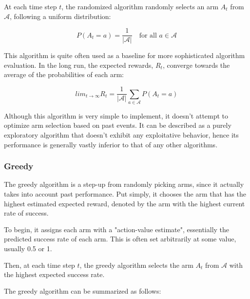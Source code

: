 At each time step $t$, the randomized algorithm randomly selects an arm $A_t$ from $\mathcal{A}$, following a uniform distribution:

$$P(A_t = a) = \frac{1}{{|\mathcal{A}|}} \quad \text{for all } a \in \mathcal{A}$$

This algorithm is quite often used as a baseline for more sophisticated algorithm evaluation. In the long run, the expected rewards, $R_t$, converge towards the average of the probabilities of each arm:

$$lim_{{t \to \infty}} R_t = \frac{1}{|\mathcal{A}|} \sum_{{a \in \mathcal{A}}} P(A_t = a)$$

Although this algorithm is very simple to implement, it doesn't attempt to optimize arm selection based on past events. It can be described as a purely exploratory algorithm that doesn't exhibit any exploitative behavior, hence its performance is generally vastly inferior to that of any other algorithms.

\subsubsection{Greedy}
\label{sec:Greedy}
The greedy algorithm is a step-up from randomly picking arms, since it actually takes into account past performance. Put simply, it chooses the arm that has the highest estimated expected reward, denoted by the arm with the highest current rate of success.

To begin, it assigns each arm with a "action-value estimate", essentially the predicted success rate of each arm. This is often set arbitrarily at some value, usually 0.5 or 1.

Then, at each time step $t$, the greedy algorithm selects the arm $A_t$ from $\mathcal{A}$ with the highest expected success rate.

The greedy algorithm can be summarized as follows:


